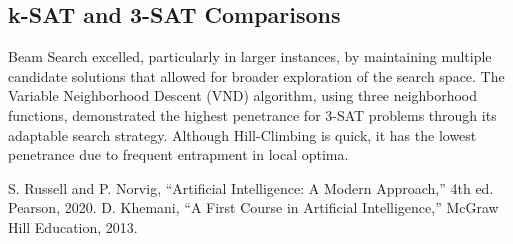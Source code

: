 \documentclass[conference]{IEEEtran}
\begin{document}
\subsection{k-SAT and 3-SAT Comparisons}
Beam Search excelled, particularly in larger instances, by maintaining multiple candidate solutions that allowed for broader exploration of the search space. The Variable Neighborhood Descent (VND) algorithm, using three neighborhood functions, demonstrated the highest penetrance for 3-SAT problems through its adaptable search strategy. Although Hill-Climbing is quick, it has the lowest penetrance due to frequent entrapment in local optima.

\begin{thebibliography}{1}
 S. Russell and P. Norvig, ``Artificial Intelligence: A Modern Approach,'' 4th ed. Pearson, 2020.
 D. Khemani, ``A First Course in Artificial Intelligence,'' McGraw Hill Education, 2013.
\end{thebibliography}
\end{document}
